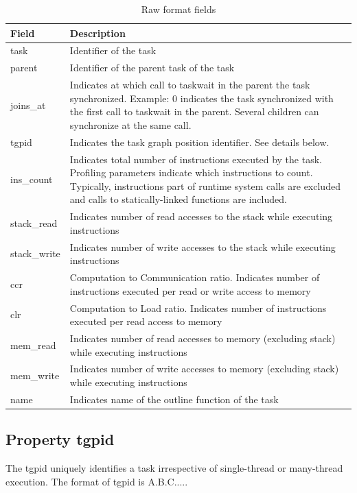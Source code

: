 \documentclass[11pt,a4paper,notitlepage]{article}
\begin{document}
\begin{table}[!htb]
\begin{tabular}{|p{2cm}|p{10cm}|}
\hline
\textbf{Field} & \textbf{Description} \\ \hline
task & Identifier of the task \\ \hline
parent & Identifier of the parent task of the task \\ \hline
joins\_at & Indicates at which call to taskwait in the parent the task synchronized. Example: 0 indicates the task synchronized with the first call to taskwait in the parent. Several children can synchronize at the same call.  \\ \hline
tgpid & Indicates the task graph position identifier. See details below.  \\ \hline
ins\_count & Indicates total number of instructions executed by the task. Profiling parameters indicate which instructions to count. Typically, instructions part of runtime system calls are excluded and calls to statically-linked functions are included.  \\ \hline
stack\_read & Indicates number of read accesses to the stack while executing instructions  \\ \hline
stack\_write & Indicates number of write accesses to the stack while executing instructions \\ \hline
ccr & Computation to Communication ratio. Indicates number of instructions executed per read or write access to memory  \\ \hline
clr & Computation to Load ratio. Indicates number of instructions executed per read access to memory  \\ \hline
mem\_read & Indicates number of read accesses to memory (excluding stack) while executing instructions  \\ \hline
mem\_write & Indicates number of write accesses to memory (excluding stack) while executing instructions  \\ \hline
name & Indicates name of the outline function of the task \\ \hline
\end{tabular}
\caption{Raw format fields}
\label{tab:raw-format}
\end{table}

\subsection{Property tgpid}
The tgpid uniquely identifies a task irrespective of single-thread or many-thread execution. 
The format of tgpid is A.B.C.....
\end{document}
